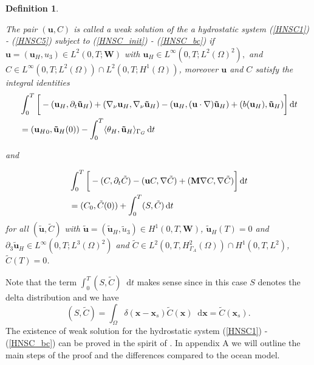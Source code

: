 \documentclass[11pt]{article}
\newtheorem{definition}{Definition}
\newcommand*\diff{\mathop{}\!\mathrm{d}}
\begin{document}
\begin{definition} \label{definitionhydrostaticWF}

The pair $(\mathbf{u}, C)$ is called a weak solution of the a hydrostatic system (\ref{HNSC1}) - (\ref{HNSC5}) subject to (\ref{HNSC_init}) - (\ref{HNSC_bc}) if $\mathbf{u} = (\mathbf{u}_H, u_3) \in L^2 (0, T; \mathbf{W})$ with $\mathbf{u}_H \in L^\infty (0,T; L^2(\Omega)^2),$ and $C \in L^\infty(0,T; L^2(\Omega)) \cap L^2(0,T; H^1(\Omega))$, moreover $\mathbf{u}$ and $C$ satisfy the integral identities
%
\begin{equation}
\begin{split}
& \int_0^T \bigg[ -(\mathbf{u}_H, \partial_t \mathbf{\tilde{u}}_H) + (\nabla_\nu \mathbf{u}_H, \nabla_\nu \mathbf{\tilde{u}}_H) - (\mathbf{u}_H, (\mathbf{u} \cdot \nabla) \mathbf{\tilde{u}}_H) + (b(\mathbf{u}_H), \mathbf{\tilde{u}}_H) \bigg ] \diff t \\
& = ({\mathbf{u}_H}_0, \mathbf{\tilde{u}}_H(0)) - \int_0^T \langle \theta_H, \mathbf{\tilde{u}}_H \rangle_{\Gamma_G} \diff t \raisetag{15pt}\label{hydrostaticWF_U}
\end{split}
\end{equation}

and

\begin{equation}
\begin{split}
& \int_0^T \bigg[ -(C, \partial_t \tilde{C}) -(\mathbf{u}C, \nabla \tilde{C}) +  (\mathbf{M} \nabla C, \nabla \tilde{C}) \bigg ] \diff t \\
& = (C_0, \tilde{C}(0)) + \int_0^T (S,\tilde{C}) \diff t \raisetag{20pt} \label{hydrostaticWF_C}
\end{split}
\end{equation}
%
for all $(\mathbf{\tilde{u}}, \tilde{C})$ with $\mathbf{\tilde{u}} = (\mathbf{\tilde{u}}_H, \tilde{u}_3) \in H^1 (0,T, \mathbf{W})$, $\mathbf{\tilde{u}}_H (T) = 0$ and $\partial_3 \mathbf{\tilde{u}}_H \in L^\infty (0, T; L^3 (\Omega)^2)$ and $\tilde{C} \in L^2 (0,T, H^2_{\Gamma_A} (\Omega)) \cap H^1 (0,T, L^2)$, $\tilde{C} (T) = 0$. 
\end{definition}

Note that the term $\int_0^T (S,\tilde{C}) \diff t$ makes sense since in this case $S$ denotes the delta distribution and we have 
%
\[ (S,\tilde{C}) = \int_\Omega \delta(\mathbf{x} - \mathbf{x}_s) \tilde{C}(\mathbf{x}) \diff \mathbf{x} = \tilde{C}(\mathbf{x}_s).\]
%
The existence of weak solution for the hydrostatic system (\ref{HNSC1}) - (\ref{HNSC_bc}) can be proved in the spirit of \cite{temam2005some}. In appendix A we will outline the main steps of the proof and the differences compared to the ocean model.
\end{document}
